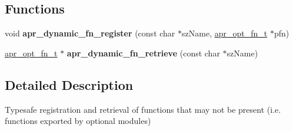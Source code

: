 \subsection*{Functions}
\begin{DoxyCompactItemize}
\item 
\hypertarget{group___a_p_r___util___opt_gaa9c7d3cc32128521274543c384e9698d}{void {\bfseries apr\-\_\-dynamic\-\_\-fn\-\_\-register} (const char $\ast$sz\-Name, \hyperlink{group___a_p_r___util___opt_ga35e08c2dbf593e3dc5a2cb0fdc8cd637}{apr\-\_\-opt\-\_\-fn\-\_\-t} $\ast$pfn)}\label{group___a_p_r___util___opt_gaa9c7d3cc32128521274543c384e9698d}

\item 
\hypertarget{group___a_p_r___util___opt_ga1ecfa6a6ced7332d03b5867735a5e49d}{\hyperlink{group___a_p_r___util___opt_ga35e08c2dbf593e3dc5a2cb0fdc8cd637}{apr\-\_\-opt\-\_\-fn\-\_\-t} $\ast$ {\bfseries apr\-\_\-dynamic\-\_\-fn\-\_\-retrieve} (const char $\ast$sz\-Name)}\label{group___a_p_r___util___opt_ga1ecfa6a6ced7332d03b5867735a5e49d}

\end{DoxyCompactItemize}


\subsection{Detailed Description}
Typesafe registration and retrieval of functions that may not be present (i.\-e. functions exported by optional modules) 

